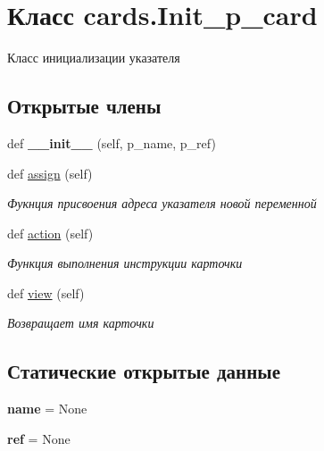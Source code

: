 \hypertarget{classcards_1_1_init__p__card}{}\section{Класс cards.\+Init\+\_\+p\+\_\+card}
\label{classcards_1_1_init__p__card}


Класс инициализации указателя  


\subsection*{Открытые члены}
\begin{DoxyCompactItemize}
\item 
\mbox{\label{classcards_1_1_init__p__card_a75fbff87ea6461b8201e0c0836d5a1b7}} 
def {\bfseries \+\_\+\+\_\+init\+\_\+\+\_\+} (self, p\+\_\+name, p\+\_\+ref)
\item 
def \mbox{\hyperlink{classcards_1_1_init__p__card_aca8213c8c2c55dfb4082e2466c6cb5cc}{assign}} (self)
\begin{DoxyCompactList}\small\item\em Фукнция присвоения адреса указателя новой переменной \end{DoxyCompactList}\item 
def \mbox{\hyperlink{classcards_1_1_init__p__card_a6e43a1cc4adb95f873317aa142d62c8f}{action}} (self)
\begin{DoxyCompactList}\small\item\em Функция выполнения инструкции карточки \end{DoxyCompactList}\item 
def \mbox{\hyperlink{classcards_1_1_init__p__card_afe86b403a86c886227ae29fa01f2947a}{view}} (self)
\begin{DoxyCompactList}\small\item\em Возвращает имя карточки \end{DoxyCompactList}\end{DoxyCompactItemize}
\subsection*{Статические открытые данные}
\begin{DoxyCompactItemize}
\item 
\mbox{\label{classcards_1_1_init__p__card_a045ddaf98405572693ac75adca60c981}} 
{\bfseries name} = None
\item 
\mbox{\label{classcards_1_1_init__p__card_a4c6fd1fca867ca4317041350b5fe933f}} 
{\bfseries ref} = None
\end{DoxyCompactItemize}


